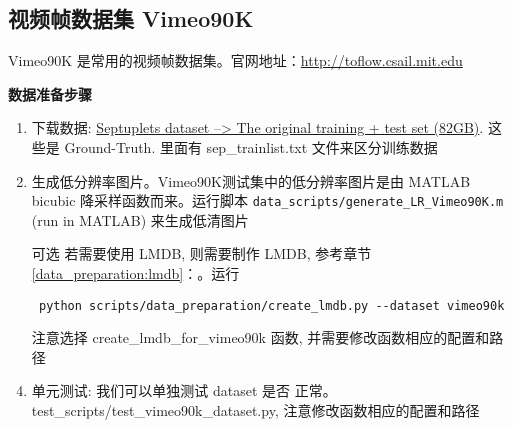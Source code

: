 \documentclass[../main.tex]{subfiles}
\begin{document}
\subsection{视频帧数据集 Vimeo90K}

Vimeo90K 是常用的视频帧数据集。官网地址：\url{http://toflow.csail.mit.edu}

\noindent\textbf{数据准备步骤}
\begin{enumerate}
    \item 下载数据: \href{http://data.csail.mit.edu/tofu/dataset/vimeo_septuplet.zip}{Septuplets dataset --> The original training + test set (82GB)}. 这些是 Ground-Truth. 里面有 sep\_trainlist.txt 文件来区分训练数据
    \item 生成低分辨率图片。Vimeo90K测试集中的低分辨率图片是由 MATLAB bicubic 降采样函数而来。运行脚本 \texttt{data\_scripts/generate\_LR\_Vimeo90K.m} (run in MATLAB) 来生成低清图片
    \item [可选] 若需要使用 LMDB, 则需要制作 LMDB, 参考章节\ref{data_preparation:lmdb}：。运行
    \begin{verbatim}
 python scripts/data_preparation/create_lmdb.py --dataset vimeo90k
\end{verbatim}
    注意选择 create\_lmdb\_for\_vimeo90k 函数, 并需要修改函数相应的配置和路径
    \item 单元测试: 我们可以单独测试 dataset 是否 正常。test\_scripts/test\_vimeo90k\_dataset.py, 注意修改函数相应的配置和路径
\end{enumerate}
\end{document}
